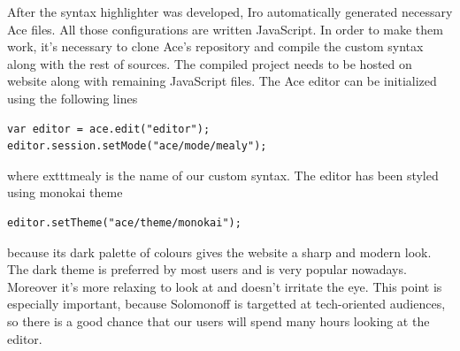After the syntax highlighter was developed, Iro automatically generated necessary Ace files. All those configurations are written JavaScript. In order to make them work, it's necessary to clone Ace's repository and compile the custom syntax along with the rest of sources. The compiled project needs to be hosted on website along with remaining JavaScript files. The Ace editor can be initialized using the following lines
\begin{lstlisting}
var editor = ace.edit("editor");
editor.session.setMode("ace/mode/mealy");
\end{lstlisting}
where     exttt{mealy} is the name of our custom syntax.
The editor has been styled using monokai theme
\begin{lstlisting}
editor.setTheme("ace/theme/monokai");
\end{lstlisting}
because its dark palette of colours gives the website a sharp and modern look. The dark theme is preferred by most users and is very popular nowadays. Moreover it's more relaxing to look at and doesn't irritate the eye\cite{syntax_highlighter}. This point is especially important, because Solomonoff is targetted at tech-oriented audiences, so there is a good chance that our users will spend many hours looking at the editor. 

